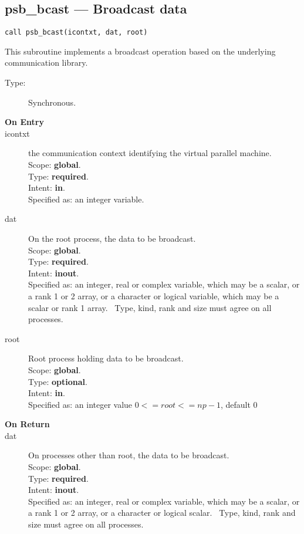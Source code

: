 \clearpage\subsection*{psb\_bcast --- Broadcast data}

\begin{verbatim}
call psb_bcast(icontxt, dat, root)
\end{verbatim}

This subroutine implements a broadcast operation based on the
underlying communication library. 
\begin{description}
\item[Type:] Synchronous.
\item[\bf  On Entry ]
\item[icontxt] the communication context identifying the virtual
  parallel machine.\\
Scope: {\bf global}.\\
Type: {\bf required}.\\
Intent: {\bf in}.\\
Specified as: an integer variable.
\item[dat] On the root process, the data to be broadcast.\\
Scope: {\bf global}.\\
Type: {\bf required}.\\
Intent: {\bf inout}.\\
Specified as: an integer, real or complex variable, which may be a
scalar, or a rank 1 or 2 array, or a character or logical variable,
which may be a scalar or rank 1 array. \
Type, kind, rank and size must agree on all processes.
\item[root] Root process holding data to be broadcast.\\
Scope: {\bf global}.\\
Type: {\bf optional}.\\
Intent: {\bf in}.\\
Specified as: an integer value $0<= root <= np-1$, default 0 \
\end{description}


\begin{description}
\item[\bf On Return]
\item[dat] On processes other than  root, the data to be broadcast.\\
Scope: {\bf global}.\\
Type: {\bf required}.\\
Intent: {\bf inout}.\\
Specified as: an integer, real or complex variable, which may be a
scalar, or a rank 1 or 2 array, or a character or logical scalar. \
Type, kind, rank and size must agree on all processes.
\end{description}


